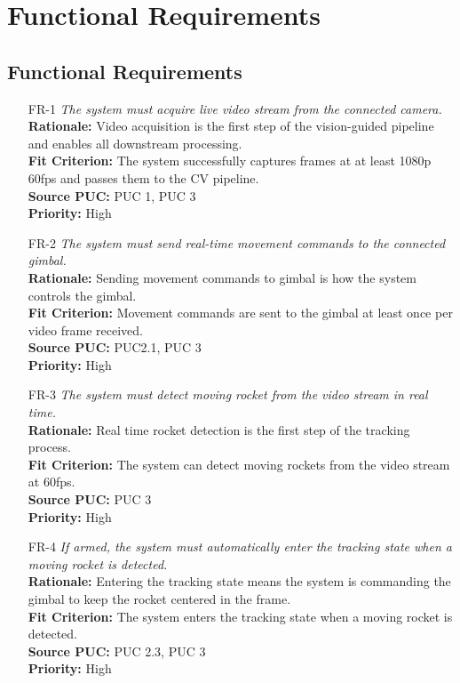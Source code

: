 \documentclass[12pt]{article}
\begin{document}
\section{Functional Requirements}
\subsection{Functional Requirements}

\begin{itemize}[leftmargin=*]

  \item[FR-1] \emph{The system must acquire live video stream from the connected
          camera.}\\[2mm]
        \textbf{Rationale:} Video acquisition is the first step of the vision-guided pipeline and enables all downstream processing.\\
        \textbf{Fit Criterion:} The system successfully captures frames at at least 1080p 60fps and passes them to the CV pipeline.\\
        \textbf{Source PUC:} PUC 1, PUC 3 \\
        \textbf{Priority:} High

  \item[FR-2] \emph{The system must send real-time movement commands to the connected
          gimbal.}\\[2mm]
        \textbf{Rationale:} Sending movement commands to gimbal is how the system controls the gimbal.\\
        \textbf{Fit Criterion:} Movement commands are sent to the gimbal at least once per video frame received.\\
        \textbf{Source PUC:} PUC2.1, PUC 3 \\
        \textbf{Priority:} High

  \item[FR-3] \emph{The system must detect moving rocket from the video stream in real
          time.}\\[2mm]
        \textbf{Rationale:} Real time rocket detection is the first step of the tracking process.\\
        \textbf{Fit Criterion:} The system can detect moving rockets from the video stream at 60fps.\\
        \textbf{Source PUC:} PUC 3 \\
        \textbf{Priority:} High

  \item[FR-4] \emph{If armed, the system must automatically enter the tracking state
          when a moving rocket is detected.}\\[2mm]
        \textbf{Rationale:} Entering the tracking state means the system is commanding the gimbal to keep the rocket centered in the frame.\\
        \textbf{Fit Criterion:} The system enters the tracking state when a moving rocket is detected.\\
        \textbf{Source PUC:} PUC 2.3, PUC 3 \\
        \textbf{Priority:} High


\end{itemize}
\end{document}
